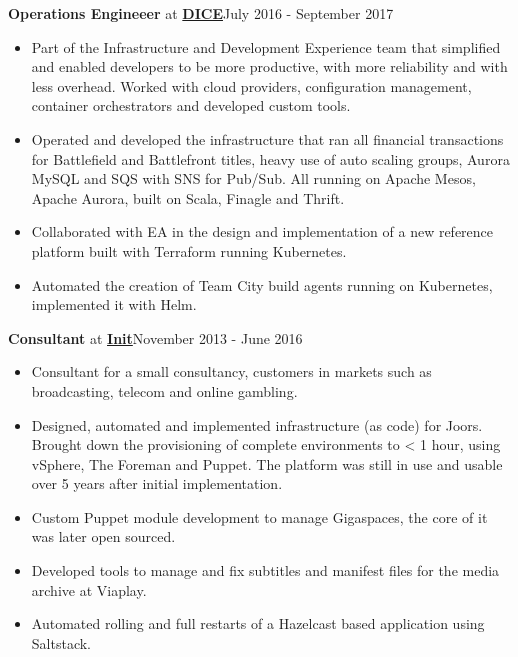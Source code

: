 \documentclass[8pt,sans]{article}
\newenvironment{outerlist}[1][\enskip\textbullet]%
        {\begin{itemize}[#1]}{\end{itemize}%
         \vspace{-.6\baselineskip}}
\newcommand{\blankline}{\quad\pagebreak[2]}
\begin{document}
\textbf{Operations Engineeer} at \href{http://www.dice.se}{\textbf{DICE}}\hfill {July 2016 - September 2017}
\begin{outerlist}
\item[] Part of the Infrastructure and Development Experience team that simplified and enabled developers to be more productive, with more reliability and with less overhead. Worked with cloud providers, configuration management, container orchestrators and developed custom tools.


\item Operated and developed the infrastructure that ran all financial transactions for Battlefield and Battlefront titles, heavy use of auto scaling groups, Aurora MySQL and SQS with SNS for Pub/Sub. All running on Apache Mesos, Apache Aurora, built on Scala, Finagle and Thrift.
\item Collaborated with EA in the design and implementation of a new reference platform built with Terraform running Kubernetes. 
\item Automated the creation of Team City build agents running on Kubernetes, implemented it with Helm.
\end{outerlist}
\blankline

\textbf{Consultant} at \href{http://www.init.se}{\textbf{Init}}\hfill {November 2013 - June 2016}
\begin{outerlist}
\item[] Consultant for a small consultancy, customers in markets such as broadcasting, telecom and online gambling.

	\item Designed, automated and implemented infrastructure (as code) for Joors. Brought down the provisioning of complete environments to < 1 hour,
		using vSphere, The Foreman and Puppet. The platform was still in use and usable over 5 years after initial implementation.
	\item Custom Puppet module development to manage Gigaspaces, the core of it was later open sourced.
	\item Developed tools to manage and fix subtitles and manifest files for the media archive at Viaplay.
	\item Automated rolling and full restarts of a Hazelcast based application using Saltstack.
\end{outerlist}
\blankline
\end{document}
